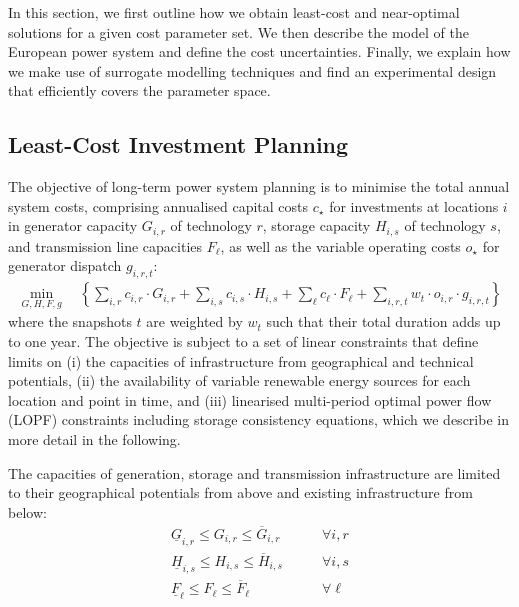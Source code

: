 In this section,
we first outline how we obtain least-cost and near-optimal solutions for a given cost parameter set.
We then describe the model of the European power system and define the cost uncertainties. 
Finally, we explain how we make use of surrogate modelling techniques
and find an experimental design that efficiently covers the parameter space.

\subsection{Least-Cost Investment Planning}
\label{sec:leastcost}

The objective of long-term power system planning is to minimise the total
annual system costs, comprising annualised capital costs $c_\star$ for investments at locations $i$
in generator capacity $G_{i,r}$ of technology $r$, storage capacity $H_{i,s}$ of technology $s$, and transmission line capacities
$F_{\ell}$, as well as the variable operating costs $o_\star$ for generator dispatch $g_{i,r,t}$:
\begin{align}
    \min_{G,H,F,g} \quad \left\{
        \sum_{i,r}   c_{i,r}  \cdot G_{i,r}  +
        \sum_{i,s}   c_{i,s}  \cdot H_{i,s}  +
        \sum_{\ell}  c_{\ell} \cdot F_{\ell} +
        \sum_{i,r,t} w_t \cdot o_{i,r} \cdot g_{i,r,t}
    \right\}
    \label{eq:objective}
\end{align}
where the snapshots $t$ are weighted by $w_t$ such that their total duration
adds up to one year. The objective is subject to a set of linear constraints that define limits on
(i) the capacities of infrastructure from geographical and technical potentials,
(ii) the availability of variable renewable energy sources for each location and point in time, and
(iii) linearised multi-period optimal power flow (LOPF) constraints including storage consistency equations,
which we describe in more detail in the following.

The capacities of generation, storage and transmission infrastructure are
limited to their geographical potentials from above and existing infrastructure from below:
\begin{align}
    \label{eq:firstA}
    \underline{G}_{i,r}  \leq G_{i,r}  \leq \overline{G}_{i,r}  &\qquad\forall i, r \\
    \underline{H}_{i,s}  \leq H_{i,s}  \leq \overline{H}_{i,s}  &\qquad\forall i, s \\
    \underline{F}_{\ell} \leq F_{\ell} \leq \overline{F}_{\ell} &\qquad\forall \ell
\end{align}

